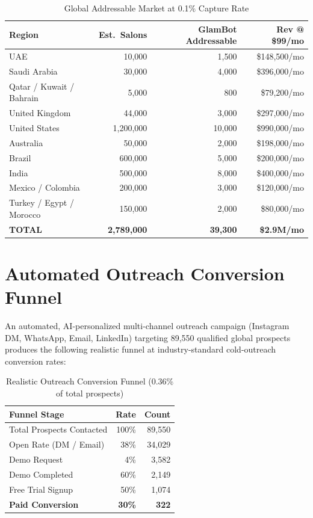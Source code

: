 \documentclass[11pt,a4paper]{report}
\begin{document}
\begin{table}[h]
\centering
\renewcommand{\arraystretch}{1.4}
\begin{tabularx}{\textwidth}{@{} l r r r @{}}
\toprule
\textbf{Region} & \textbf{Est.\ Salons} & \textbf{GlamBot Addressable} & \textbf{Rev @ \$99/mo} \\
\midrule
UAE                     & 10,000    & 1,500  & \$148,500/mo \\
Saudi Arabia            & 30,000    & 4,000  & \$396,000/mo \\
Qatar / Kuwait / Bahrain& 5,000     & 800    & \$79,200/mo  \\
United Kingdom          & 44,000    & 3,000  & \$297,000/mo \\
United States           & 1,200,000 & 10,000 & \$990,000/mo \\
Australia               & 50,000    & 2,000  & \$198,000/mo \\
Brazil                  & 600,000   & 5,000  & \$200,000/mo \\
India                   & 500,000   & 8,000  & \$400,000/mo \\
Mexico / Colombia       & 200,000   & 3,000  & \$120,000/mo \\
Turkey / Egypt / Morocco& 150,000   & 2,000  & \$80,000/mo  \\
\midrule
\textbf{TOTAL}          & \textbf{2,789,000} & \textbf{39,300} & \textbf{\$2.9M/mo} \\
\bottomrule
\end{tabularx}
\caption{Global Addressable Market at 0.1\% Capture Rate}
\end{table}

\section{Automated Outreach Conversion Funnel}
An automated, AI-personalized multi-channel outreach campaign (Instagram DM, WhatsApp, Email, LinkedIn) targeting 89,550 qualified global prospects produces the following realistic funnel at industry-standard cold-outreach conversion rates:

\begin{table}[h]
\centering
\renewcommand{\arraystretch}{1.4}
\begin{tabularx}{\textwidth}{@{} X r r @{}}
\toprule
\textbf{Funnel Stage} & \textbf{Rate} & \textbf{Count} \\
\midrule
Total Prospects Contacted   & 100\%  & 89,550 \\
Open Rate (DM / Email)      & 38\%   & 34,029 \\
Demo Request                & 4\%    & 3,582  \\
Demo Completed              & 60\%   & 2,149  \\
Free Trial Signup           & 50\%   & 1,074  \\
\textbf{Paid Conversion}    & \textbf{30\%}   & \textbf{322} \\
\bottomrule
\end{tabularx}
\caption{Realistic Outreach Conversion Funnel (0.36\% of total prospects)}
\end{table}
\end{document}

